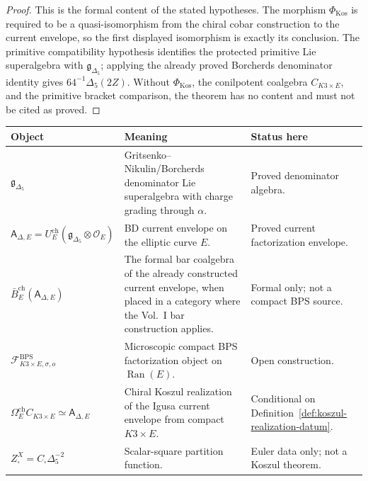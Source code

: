 \begin{proof}
This is the formal content of the stated hypotheses.  The morphism
\(\Phi_{\mathrm{Kos}}\) is required to be a quasi-isomorphism from the
chiral cobar construction to the current envelope, so the first displayed
isomorphism is exactly its conclusion.  The primitive compatibility
hypothesis identifies the protected primitive Lie superalgebra with
\(\mathfrak g_{\Delta_5}\); applying the already proved Borcherds
denominator identity gives \(64^{-1}\Delta_5(2Z)\).  Without
\(\Phi_{\mathrm{Kos}}\), the conilpotent coalgebra \(C_{K3\times E}\),
and the primitive bracket comparison, the theorem has no content and must
not be cited as proved.
\end{proof}

\begin{center}
\begingroup
\small
\begin{tabular}{p{}|p{}|p{}}
\textbf{Object} & \textbf{Meaning} & \textbf{Status here}\\ \hline
\(\mathfrak g_{\Delta_5}\) &
Gritsenko--Nikulin/Borcherds denominator Lie superalgebra with charge
grading through \(\alpha\). &
Proved denominator algebra.\\
\(\mathsf A_{\Delta,E}=
U_E^{\mathrm{ch}}(\mathfrak g_{\Delta_5}\otimes\mathcal O_E)\) &
BD current envelope on the elliptic curve \(E\). &
Proved current factorization envelope.\\
\(\bar B^{\mathrm{ch}}_E(\mathsf A_{\Delta,E})\) &
The formal bar coalgebra of the already constructed current envelope,
when placed in a category where the Vol.~I bar construction applies. &
Formal only; not a compact BPS source.\\
\(\mathcal F^{\mathrm{BPS}}_{K3\times E,\sigma,o}\) &
Microscopic compact BPS factorization object on \(\operatorname{Ran}(E)\). &
Open construction.\\
\(\Omega^{\mathrm{ch}}_E C_{K3\times E}\simeq\mathsf A_{\Delta,E}\) &
Chiral Koszul realization of the Igusa current envelope from compact
\(K3\times E\). &
Conditional on Definition~\ref{def:koszul-realization-datum}.\\
\(Z^X_\square=C_\square\Delta_5^{-2}\) &
Scalar-square partition function. &
Euler data only; not a Koszul theorem.
\end{tabular}
\endgroup
\end{center}

